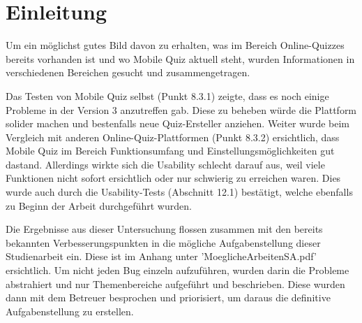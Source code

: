 





\section{Einleitung}

Um ein möglichst gutes Bild davon zu erhalten, was im Bereich Online-Quizzes bereits vorhanden ist und wo Mobile Quiz aktuell steht, wurden Informationen in verschiedenen Bereichen gesucht und zusammengetragen.


Das Testen von Mobile Quiz selbst (Punkt 8.3.1) zeigte, dass es noch einige Probleme in der Version 3 anzutreffen gab. Diese zu beheben würde die Plattform solider machen und bestenfalls neue Quiz-Ersteller anziehen.
Weiter wurde beim Vergleich mit anderen Online-Quiz-Plattformen (Punkt 8.3.2) ersichtlich, dass Mobile Quiz im Bereich Funktionsumfang und Einstellungsmöglichkeiten gut dastand. Allerdings wirkte sich die Usability schlecht darauf aus, weil viele Funktionen nicht sofort ersichtlich oder nur schwierig zu erreichen waren. Dies wurde auch durch die Usability-Tests (Abschnitt 12.1) bestätigt, welche ebenfalls zu Beginn der Arbeit durchgeführt wurden.

Die Ergebnisse aus dieser Untersuchung flossen zusammen mit den bereits bekannten Verbesserungspunkten in die mögliche Aufgabenstellung dieser Studienarbeit ein. Diese ist im Anhang unter 'MoeglicheArbeitenSA.pdf' ersichtlich. Um nicht jeden Bug einzeln aufzuführen, wurden darin die Probleme abstrahiert und nur Themenbereiche aufgeführt und beschrieben. Diese wurden dann mit dem Betreuer besprochen und priorisiert, um daraus die definitive Aufgabenstellung zu erstellen.

